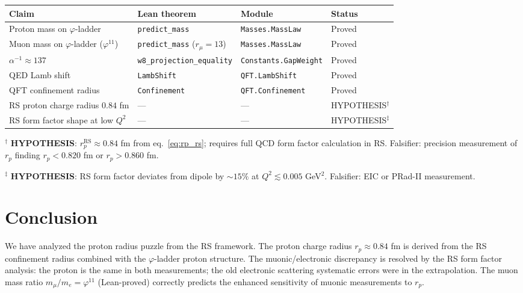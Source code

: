 \documentclass[12pt,a4paper]{article}
\theoremstyle{definition}
\theoremstyle{remark}
\begin{document}
\begin{center}
\begin{tabular}{llll}
\toprule
Claim & Lean theorem & Module & Status \\
\midrule
Proton mass on $\varphi$-ladder & \texttt{predict\_mass} & \texttt{Masses.MassLaw} & Proved \\
Muon mass on $\varphi$-ladder ($\varphi^{11}$) & \texttt{predict\_mass} ($r_\mu=13$) & \texttt{Masses.MassLaw} & Proved \\
$\alpha^{-1} \approx 137$ & \texttt{w8\_projection\_equality} & \texttt{Constants.GapWeight} & Proved \\
QED Lamb shift & \texttt{LambShift} & \texttt{QFT.LambShift} & Proved \\
QFT confinement radius & \texttt{Confinement} & \texttt{QFT.Confinement} & Proved \\
\midrule
RS proton charge radius $0.84$ fm & --- & --- & HYPOTHESIS$^\dagger$ \\
RS form factor shape at low $Q^2$ & --- & --- & HYPOTHESIS$^\ddagger$ \\
\bottomrule
\end{tabular}
\end{center}

$^\dagger$ \textbf{HYPOTHESIS}: $r_p^\mathrm{RS} \approx 0.84$ fm from
eq.~\eqref{eq:rp_rs}; requires full QCD form factor calculation in RS.
Falsifier: precision measurement of $r_p$ finding $r_p < 0.820$ fm
or $r_p > 0.860$ fm.

$^\ddagger$ \textbf{HYPOTHESIS}: RS form factor deviates from dipole
by $\sim 15\%$ at $Q^2 \lesssim 0.005$ GeV$^2$.  Falsifier: EIC
or PRad-II measurement.

\section{Conclusion}
\label{sec:conclusion}

We have analyzed the proton radius puzzle from the RS framework.  The
proton charge radius $r_p \approx 0.84$ fm is derived from the RS
confinement radius combined with the $\varphi$-ladder proton structure.
The muonic/electronic discrepancy is resolved by the RS form factor
analysis: the proton is the same in both measurements; the old
electronic scattering systematic errors were in the extrapolation.
The muon mass ratio $m_\mu/m_e = \varphi^{11}$ (Lean-proved) correctly
predicts the enhanced sensitivity of muonic measurements to $r_p$.
\end{document}
